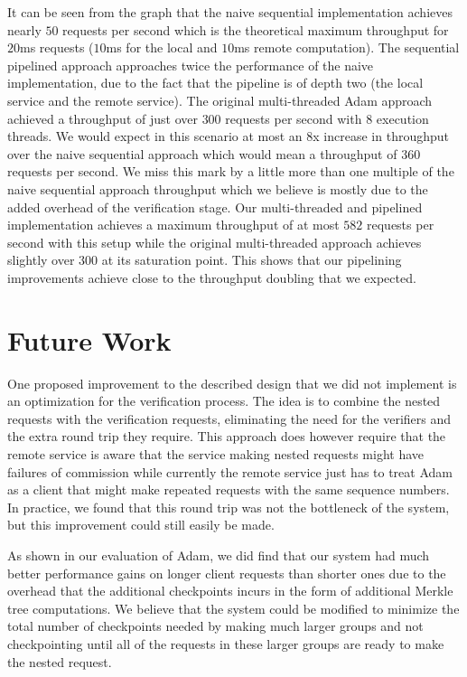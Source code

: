 \documentclass[11pt, oneside]{report}
\begin{document}
It can be seen from the graph that the naive sequential implementation achieves nearly $50$ requests per second which is the theoretical maximum throughput for $20$ms requests ($10$ms for the local and $10$ms remote computation). 
The sequential pipelined approach approaches twice the performance of the naive implementation, due to the fact that the pipeline is of depth two (the local service and the remote service).
The original multi-threaded Adam approach achieved a throughput of just over $300$ requests per second with $8$ execution threads. We would expect in this scenario at most an 8x increase in throughput over the naive sequential approach which would mean a throughput of $360$ requests per second.
We miss this mark by a little more than one multiple of the naive sequential approach throughput which we believe is mostly due to the added overhead of the verification stage.
Our multi-threaded and pipelined implementation achieves a maximum throughput of at most $582$ requests per second with this setup while the original multi-threaded approach achieves slightly over $300$ at its saturation point. 
This shows that our pipelining improvements achieve close to the throughput doubling that we expected.

\chapter{Future Work}\label{FutureWork}

One proposed improvement to the described design that we did not implement is an optimization for the verification process.
The idea is to combine the nested requests with the verification requests, eliminating the need for the verifiers and the extra round trip they require.
This approach does however require that the remote service is aware that the service making nested requests might have failures of commission while currently the remote service just has to treat Adam as a client that might make repeated requests with the same sequence numbers. 
In practice, we found that this round trip was not the bottleneck of the system, but this improvement could still easily be made.

As shown in our evaluation of Adam, we did find that our system had much better performance gains on longer client requests than shorter ones due to the overhead that the additional checkpoints incurs in the form of additional Merkle tree computations. 
We believe that the system could be modified to minimize the total number of checkpoints needed by making much larger groups and not checkpointing until all of the requests in these larger groups are ready to make the nested request.
\end{document}
